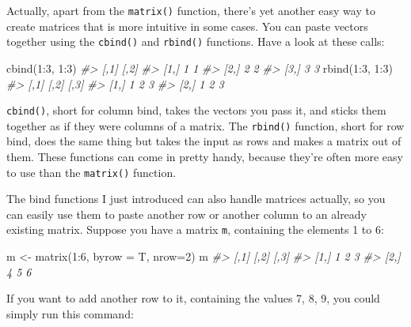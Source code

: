 \documentclass[
]{book}
\newenvironment{Shaded}{\begin{snugshade}}{\end{snugshade}}
\newcommand{\AttributeTok}[1]{\textcolor[rgb]{0.77,0.63,0.00}{#1}}
\newcommand{\CommentTok}[1]{\textcolor[rgb]{0.56,0.35,0.01}{\textit{#1}}}
\newcommand{\DecValTok}[1]{\textcolor[rgb]{0.00,0.00,0.81}{#1}}
\newcommand{\FunctionTok}[1]{\textcolor[rgb]{0.00,0.00,0.00}{#1}}
\newcommand{\NormalTok}[1]{#1}
\newcommand{\OtherTok}[1]{\textcolor[rgb]{0.56,0.35,0.01}{#1}}
\newcommand{\SpecialCharTok}[1]{\textcolor[rgb]{0.00,0.00,0.00}{#1}}
\begin{document}
Actually, apart from the \texttt{matrix()} function, there's yet another easy way to create matrices that is more intuitive in some cases. You can paste vectors together using the \texttt{cbind()} and \texttt{rbind()} functions. Have a look at these calls:

\begin{Shaded}
\begin{Highlighting}[]
\FunctionTok{cbind}\NormalTok{(}\DecValTok{1}\SpecialCharTok{:}\DecValTok{3}\NormalTok{, }\DecValTok{1}\SpecialCharTok{:}\DecValTok{3}\NormalTok{)}
\CommentTok{\#\textgreater{}      [,1] [,2]}
\CommentTok{\#\textgreater{} [1,]    1    1}
\CommentTok{\#\textgreater{} [2,]    2    2}
\CommentTok{\#\textgreater{} [3,]    3    3}
\FunctionTok{rbind}\NormalTok{(}\DecValTok{1}\SpecialCharTok{:}\DecValTok{3}\NormalTok{, }\DecValTok{1}\SpecialCharTok{:}\DecValTok{3}\NormalTok{)}
\CommentTok{\#\textgreater{}      [,1] [,2] [,3]}
\CommentTok{\#\textgreater{} [1,]    1    2    3}
\CommentTok{\#\textgreater{} [2,]    1    2    3}
\end{Highlighting}
\end{Shaded}

\texttt{cbind()}, short for column bind, takes the vectors you pass it, and sticks them together as if they were columns of a matrix. The \texttt{rbind()} function, short for row bind, does the same thing but takes the input as rows and makes a matrix out of them. These functions can come in pretty handy, because they're often more easy to use than the \texttt{matrix()} function.

The bind functions I just introduced can also handle matrices actually, so you can easily use them to paste another row or another column to an already existing matrix. Suppose you have a matrix \texttt{m}, containing the elements 1 to 6:

\begin{Shaded}
\begin{Highlighting}[]
\NormalTok{m }\OtherTok{\textless{}{-}} \FunctionTok{matrix}\NormalTok{(}\DecValTok{1}\SpecialCharTok{:}\DecValTok{6}\NormalTok{, }\AttributeTok{byrow =}\NormalTok{ T, }\AttributeTok{nrow=}\DecValTok{2}\NormalTok{)}
\NormalTok{m}
\CommentTok{\#\textgreater{}      [,1] [,2] [,3]}
\CommentTok{\#\textgreater{} [1,]    1    2    3}
\CommentTok{\#\textgreater{} [2,]    4    5    6}
\end{Highlighting}
\end{Shaded}

If you want to add another row to it, containing the values 7, 8, 9, you could simply run this command:
\end{document}
